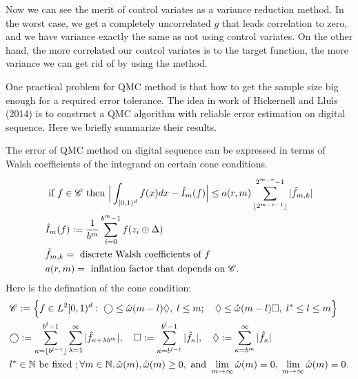 Now we can see the merit of control variates as a variance reduction method. 
In the worst case, we get a completely uncorrelated $g$ that leads correlation to zero, and we have variance exactly the same as not using control variates. On the other hand, the more correlated our control variates is to the target function, the more variance we can get rid of by using the method.



One practical problem for QMC method is that how to get the sample size big enough for a required error tolerance. The idea in work of Hickernell and Llu{\'\i}s (2014)\cite{hickernell2014reliable} is to construct a QMC algorithm with reliable error estimation on digital sequence. Here we briefly summarize their results.

The error of QMC method on digital sequence can be expressed in terms of Walsh coefficients of the integrand on certain cone conditions. 
\begin{align}
    \label{eq:errBound}
    &\text{ if } f \in \mathscr{C}\text{ then } \Big|\int_{[0,1)^d}f(x)dx - \hat{I}_m(f)\Big| \leq a(r,m) \sum_{\lfloor 2^{m-r-1} \rfloor}^{2^{m-r}-1} |\tilde{f}_{m,k}|\\
    &\hat{I}_m(f): = \frac{1}{b^m}\sum_{i=0}^{b^m-1}f(z_i\oplus \Delta)\notag\\
    &\tilde{f}_{m,k}=\text{ discrete Walsh coefficients of }f \notag\\
    &a(r,m) =\text{ inflation factor that depends on } \mathscr{C} \notag.
\end{align}
Here is the defination of the cone condition:
\begin{align}
   &\mathscr{C}:=\Big\{f\in L^2[0,1)^d:\;\bigcirc \leq \hat{\omega}(m-l)\Diamond,\; l\leq m;\quad
   \Diamond \leq \mathring{\omega}(m-l) \Box, 
   \; l^*\leq l \leq m\Big\}\notag\\
   \label{eq:cone}
   &\bigcirc:= \sum_{\kappa=\lfloor b^{l-1} \rfloor}^{b^l-1} \sum_{\lambda=1}^{\infty}| \hat{f}_{\kappa+\lambda b^m}|,\quad  
   \Box:= \sum_{\kappa=b^{l-1}}^{b^l-1}|\hat{f}_\kappa|,\quad
   \Diamond:=\sum_{\kappa=b^m}^{\infty}|\hat{f}_{\kappa}|\\
   &l^*\in \mathbb{N}\text{ be fixed }; \forall m\in \mathbb{N},\hat{\omega}(m),\mathring{\omega}(m)\geq 0, \text{ and } \lim_{m\to \infty} \hat{\omega}(m)=0,\; \lim_{m\to \infty} \mathring{\omega}(m)=0\notag.
\end{align}

